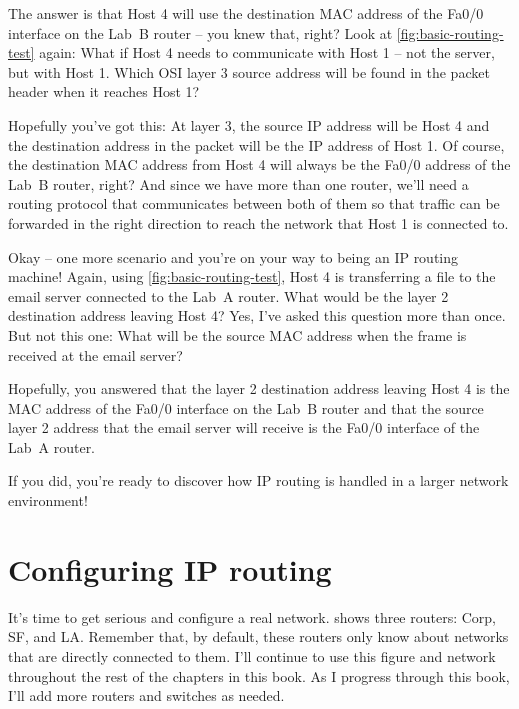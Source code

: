 The answer is that Host 4 will use the destination MAC address of the
Fa0/0 interface on the Lab~B router -- you knew that, right? Look at
\cref{fig:basic-routing-test} again: What
if Host 4 needs to communicate with Host 1 -- not the server, but with
Host 1. Which OSI layer 3 source address will be found in the packet
header when it reaches Host 1?

Hopefully you've got this: At layer 3, the source IP address will be
Host 4 and the destination address in the packet will be the IP address
of Host 1. Of course, the destination MAC address from Host 4 will
always be the Fa0/0 address of the Lab~B router, right? And since we
have more than one router, we'll need a routing protocol that
communicates between both of them so that traffic can be forwarded in
the right direction to reach the network that Host 1 is connected to.

Okay -- one more scenario and you're on your way to being an IP routing
machine! Again, using
\cref{fig:basic-routing-test}, Host 4 is
transferring a file to the email server connected to the Lab~A router.
What would be the layer 2 destination address leaving Host 4? Yes, I've
asked this question more than once. But not this one: What will be the
source MAC address when the frame is received at the email server?

Hopefully, you
answered that the layer 2 destination address leaving Host 4 is the MAC
address of the Fa0/0 interface on the Lab~B router and that the source
layer 2 address that the email server will receive is the Fa0/0
interface of the Lab~A router.

If you did, you're ready to discover how IP routing is handled in a
larger network environment!




\section{Configuring IP routing}

It's time to get serious and configure a real network.
 shows three
routers: Corp, SF, and LA. Remember that, by default, these routers only
know about networks that are directly connected to them. I'll continue
to use this figure and network throughout the rest of the chapters in
this book. As I progress through this book, I'll add more routers and
switches as needed.

